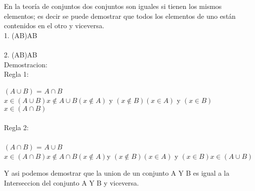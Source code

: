 \documentclass{book}
\begin{document}
En la teoría de conjuntos dos conjuntos son iguales si tienen los mismos elementos; es decir se puede demostrar que todos los elementos de uno están contenidos en  el otro y viceversa.
\\
1. (A\cup B)\equiv A\cap B\\ \\

2. (A\cap B)\equiv A\cup B\\

Demostracion:\\
Regla 1:
\begin{center}
  $(A\cup B)$ = $A\cap B$\\
  $x \in (A\cup B)$\rightarrow $x \not\in A\cup B$\righarrow $(x \not\in A)$ y $(x \not\in B)$\rightarrow $(x\in A)$ y $(x \in B)$\rightarrow $ x \in (A \cap B) $\\\\

  Regla 2:\\\\
  $(A\cap B)$ = $A \cup B$\\
  $x \in (A\cap B )$\leftrightarrow $x\not\in A \cap B$\leftrightarrow $(x\not\in A)$y $(x\not\in B)$\leftrightarrow $(x\in A)$ y $(x\in B)$\leftrightarrow $x\in (A\cup B)$\\ 
\end{center}
Y asi podemos demostrar que la union de un conjunto A Y B es igual a la Interseccion del conjunto A Y B y viceversa.
\end{document}
